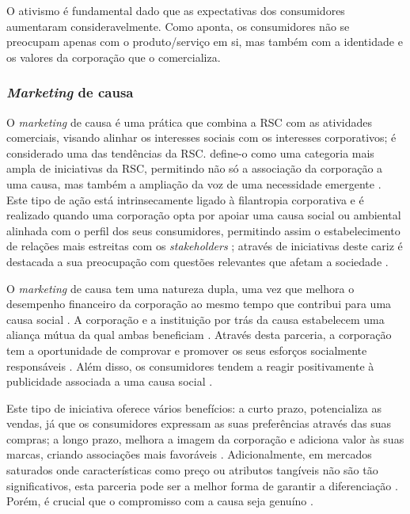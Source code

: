 \documentclass[portuguese]{textolivre}
\begin{document}
O ativismo é fundamental dado que as expectativas dos consumidores aumentaram consideravelmente. Como \textcite{korschun_brand_2021} aponta, os consumidores não se preocupam apenas com o produto/serviço em si, mas também com a identidade e os valores da corporação que o comercializa.

\subsubsection{\textit{Marketing} de causa}\label{sec-idioma}
O \textit{marketing} de causa é uma prática que combina a RSC com as atividades comerciais, visando alinhar os interesses sociais com os interesses corporativos; é considerado uma das tendências da RSC. \textcite{beise-zee_cause-related_2013} define-o como uma categoria mais ampla de iniciativas da RSC, permitindo não só a associação da corporação a uma causa, mas também a ampliação da voz de uma necessidade emergente \cite{conley_como_2010}. Este tipo de ação está intrinsecamente ligado à filantropia corporativa e é realizado quando uma corporação opta por apoiar uma causa social ou ambiental alinhada com o perfil dos seus consumidores, permitindo assim o estabelecimento de relações mais estreitas com os \textit{stakeholders} \cite{beise-zee_cause-related_2013}; através de iniciativas deste cariz é destacada a sua preocupação com questões relevantes que afetam a sociedade \cite{kotler_marketing_2022}.

O \textit{marketing} de causa tem uma natureza dupla, uma vez que melhora o desempenho financeiro da corporação ao mesmo tempo que contribui para uma causa social \cite{robinson_choice_2012}. A corporação e a instituição por trás da causa estabelecem uma aliança mútua da qual ambas beneficiam \cite{fill_marketing_2016}. Através desta parceria, a corporação tem a oportunidade de comprovar e promover os seus esforços socialmente responsáveis \cite{beise-zee_cause-related_2013}. Além disso, os consumidores tendem a reagir positivamente à publicidade associada a uma causa social \cite{schiffman_consumer_2019}.

Este tipo de iniciativa oferece vários benefícios: a curto prazo, potencializa as vendas, já que os consumidores expressam as suas preferências através das suas compras; a longo prazo, melhora a imagem da corporação e adiciona valor às suas marcas, criando associações mais favoráveis \cite{conley_como_2010,beise-zee_cause-related_2013}. Adicionalmente, em mercados saturados onde características como preço ou atributos tangíveis não são tão significativos, esta parceria pode ser a melhor forma de garantir a diferenciação \cite{fill_marketing_2016}. Porém, é crucial que o compromisso com a causa seja genuíno \cite{conley_como_2010}.
\end{document}
